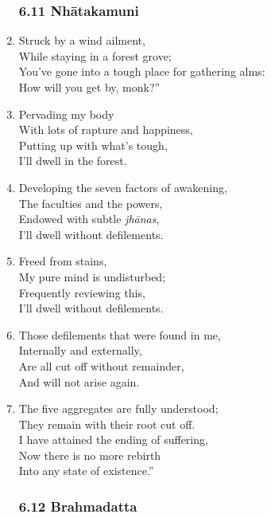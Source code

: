 \documentclass[10pt, openany]{book}
\newcommand*{\vleftofline}[1]{\leavevmode\llap{#1}}
\begin{document}
\begin{enumerate}
\subsubsection*{6.11 Nhātakamuni}

\item \vleftofline{“}Struck by a wind ailment,\\
While staying in a forest grove;\\
You’ve gone into a tough place for gathering alms:\\
How will you get by, monk?”

\item \vleftofline{“}Pervading my body\\
With lots of rapture and happiness,\\
Putting up with what’s tough,\\
I’ll dwell in the forest.

\item Developing the seven factors of awakening,\\
The faculties and the powers,\\
Endowed with subtle \emph{jhānas},\\
I’ll dwell without defilements.

\item Freed from stains,\\
My pure mind is undisturbed;\\
Frequently reviewing this,\\
I’ll dwell without defilements.

\item Those defilements that were found in me,\\
Internally and externally,\\
Are all cut off without remainder,\\
And will not arise again.

\item The five aggregates are fully understood;\\
They remain with their root cut off.\\
I have attained the ending of suffering,\\
Now there is no more rebirth \\
Into any state of existence.”

\subsubsection*{6.12 Brahmadatta}


\end{enumerate}
\end{document}
